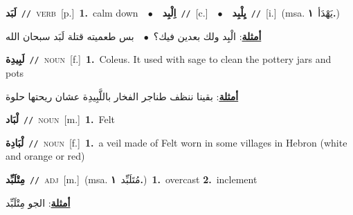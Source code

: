 \documentclass[10pt,a4paper,twoside]{article} %
\begin{document}
\begin{multicols}{2}
{\setlength\topsep{0pt}\textbf{\foreignlanguage{arabic}{لَبَد}}\ {\color{gray}\texttt{//}\color{black}}\ \textsc{verb}\ [p.]\ \textbf{1.}~calm down\ \ $\bullet$\ \ \setlength\topsep{0pt}\textbf{\foreignlanguage{arabic}{اِلْبِد}}\ {\color{gray}\texttt{//}\color{black}}\ [c.]\ \ $\bullet$\ \ \setlength\topsep{0pt}\textbf{\foreignlanguage{arabic}{يِلْبِد}}\ {\color{gray}\texttt{//}\color{black}}\ [i.]\ \color{gray}(msa. \foreignlanguage{arabic}{يَهْدَأ}~\foreignlanguage{arabic}{\textbf{١.}})\color{black}\  \begin{flushright}\color{gray}\foreignlanguage{arabic}{\textbf{\underline{\foreignlanguage{arabic}{أمثلة}}}: الْبِد ولك بعدين فيك؟\ $\bullet$\ \  بس طعميته قتلة لَبَد سبحان الله}\end{flushright}\color{black}} \vspace{2mm}

{\setlength\topsep{0pt}\textbf{\foreignlanguage{arabic}{لَبِيدِة}}\ {\color{gray}\texttt{//}\color{black}}\ \textsc{noun}\ [f.]\ \textbf{1.}~Coleus. It used with sage to clean the pottery jars and pots\  \begin{flushright}\color{gray}\foreignlanguage{arabic}{\textbf{\underline{\foreignlanguage{arabic}{أمثلة}}}: بقينا ننظف طناجر الفخار باللَّبِيدِة عشان ريحتها حلوة}\end{flushright}\color{black}} \vspace{2mm}

{\setlength\topsep{0pt}\textbf{\foreignlanguage{arabic}{لْبَاد}}\ {\color{gray}\texttt{//}\color{black}}\ \textsc{noun}\ [m.]\ \textbf{1.}~Felt\ } \vspace{2mm}

{\setlength\topsep{0pt}\textbf{\foreignlanguage{arabic}{لْبَادِة}}\ {\color{gray}\texttt{//}\color{black}}\ \textsc{noun}\ [f.]\ \textbf{1.}~a veil made of Felt worn in some villages in Hebron (white and orange or red)\ } \vspace{2mm}

{\setlength\topsep{0pt}\textbf{\foreignlanguage{arabic}{مِتْلَبِّد}}\ {\color{gray}\texttt{//}\color{black}}\ \textsc{adj}\ [m.]\ \color{gray}(msa. \foreignlanguage{arabic}{مُتَلَبِّد}~\foreignlanguage{arabic}{\textbf{١.}})\color{black}\ \textbf{1.}~overcast  \textbf{2.}~inclement\  \begin{flushright}\color{gray}\foreignlanguage{arabic}{\textbf{\underline{\foreignlanguage{arabic}{أمثلة}}}: الجو مِتْلَبِّد}\end{flushright}\color{black}} \vspace{2mm}


\end{multicols}
\end{document}
